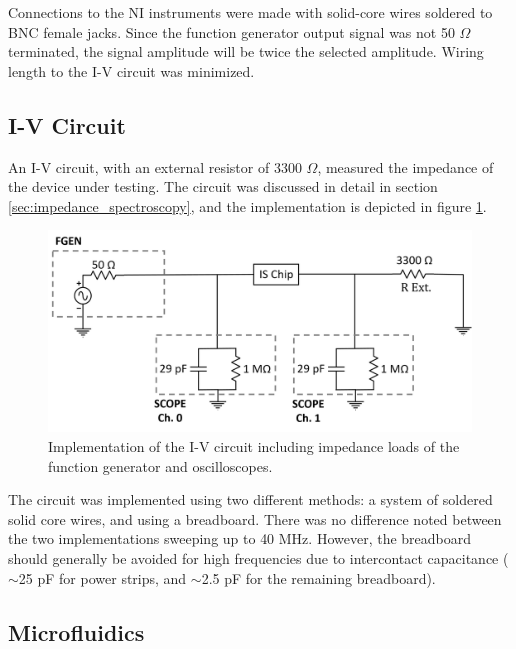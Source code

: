 \par Connections to the NI instruments were made with solid-core wires soldered to BNC female jacks. Since the function generator output signal was not 50 $\Omega$ terminated, the signal amplitude will be twice the selected amplitude. Wiring length to the I-V circuit was minimized. 

\subsection*{I-V Circuit}
\par An I-V circuit, with an external resistor of 3300 $\Omega$, measured the impedance of the device under testing. The circuit was discussed in detail in section \ref{sec:impedance_spectroscopy}, and the implementation is depicted in figure \ref{fig:I-V_implementation}.

\begin{figure}[h]
    \centering
    \includegraphics[width=\textwidth]{images/method_I-V.png}
    \caption[Implementation of I-V circuit]{Implementation of the I-V circuit including impedance loads of the function generator and oscilloscopes.}
    \label{fig:I-V_implementation}
\end{figure}

\par The circuit was implemented using two different methods: a system of soldered solid core wires, and using a breadboard. There was no difference noted between the two implementations sweeping up to 40 MHz. However, the breadboard should generally be avoided for high frequencies due to intercontact capacitance ($\sim$25 pF for power strips, and $\sim$2.5 pF for the remaining breadboard).


\subsection{Microfluidics}

